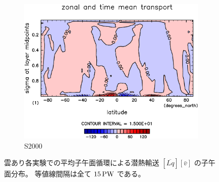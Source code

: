 \documentclass[body]{subfiles}
\begin{document}
\begin{figure}[t]
\begin{subfigure}{.4\textwidth}
		\includegraphics[width=\textwidth]{S2000/MeriHeatTransTest@latentEn_M,time=7300:7665-crop-rotate.pdf}
		\caption{S2000}\label{潜熱平均子午面循環S2000}
	\end{subfigure}
	\caption[雲あり各実験での平均子午面循環による潜熱輸送の子午面分布]{
		雲あり各実験での平均子午面循環による潜熱輸送 \([\overline{Lq}][\bar v]\) の子午面分布。
		等値線間隔は全て \(15\hmu{PW}\) である。
	}\label{潜熱平均子午面循環}
\end{figure}
\end{document}
